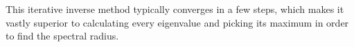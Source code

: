 This iterative inverse method typically converges in a few steps, which makes it
vastly superior to calculating every eigenvalue and picking its maximum in order
to find the spectral radius.\\

%
%
%
